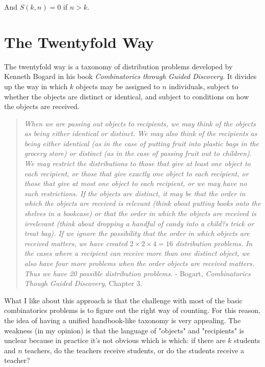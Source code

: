 And $S(k,n) = 0$ if $n>k$.




\section{The Twentyfold Way}
\label{twentyfoldway}

The twentyfold way is a taxonomy of distribution problems developed by Kenneth Bogard in his book \textit{Combinatorics through Guided Discovery}. It divides up the way in which $k$ objects may be assigned to $n$ individuals, subject to whether the objects are distinct or identical, and subject to conditions on how the objects are received.


\begin{quote}
\textit{When we are passing out objects to recipients, we may think of the objects as being either identical or distinct. We may also think of the recipients as being either identical (as in the case of putting fruit into plastic bags in the grocery store) or distinct (as in the case of passing fruit out to children). We may restrict the distributions to those that give at least one object to each recipient, or those that give exactly one object to each recipient, or those that give at most one object to each recipient, or we may have no such restrictions. If the objects are distinct, it may be that the order in which the objects are received is relevant (think about putting books onto the shelves in a bookcase) or that the order in which the objects are received is irrelevant (think about dropping a handful of candy into a child?s trick or treat bag). If we ignore the possibility that the order in which objects are received matters, we have created $2\times2\times4 = 16$ distribution problems. In the cases where a recipient can receive more than one distinct object, we also have four more problems when the order objects are received matters. Thus we have 20 possible distribution problems.} - Bogart, \textit{Combinatorics Though Guided Discovery}, Chapter 3.
\end{quote}


What I like about this approach is that the challenge with most of the basic combinatorics problems is to figure out the right way of counting. For this reason, the idea of having a unified handbook-like taxonomy is very appealing. The weakness (in my opinion) is that the language of "objects" and "recipients" is unclear because in practice it's not obvious which is which: if there are $k$ students and $n$ teachers, do the teachers receive students, or do the students receive a teacher? 

